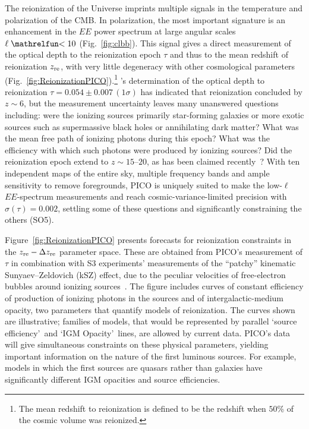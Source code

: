 \documentclass[PICOReport.tex]{subfiles}
\begin{document}
The reionization of the Universe imprints multiple signals in the temperature and polarization of the CMB.  In polarization, the most important signature is an enhancement in the $EE$ power spectrum at large angular scales $\ell \simlt 10$ (Fig.~\ref{fig:clbb}). This signal gives a direct measurement of the optical depth to the reionization epoch $\tau$ and thus to the mean redshift of reionization $z_{\rm re}$, with very little degeneracy with other cosmological parameters (Fig.~\ref{fig:ReionizationPICO}).\footnote{The mean redshift to reionization is defined to be the redshift when $50$\% of the cosmic volume was reionized.} \planck 's determination of the optical depth to reionization $\tau = 0.054 \pm 0.007\, (1\sigma) $ has indicated that reionization concluded by $z \sim 6$, but the measurement uncertainty leaves many unanswered questions including: were the ionizing sources primarily star-forming galaxies or more exotic sources such as supermassive black holes or annihilating dark matter? What was the mean free path of ionizing photons during this epoch?  What was the efficiency with which such photons were produced by ionizing sources?  
Did the reionization epoch extend to $z \sim 15$--$20$, as has been claimed recently~\citep{Miranda2017}?
With ten independent maps of the entire sky, multiple frequency bands and ample sensitivity to remove foregrounds, PICO is uniquely suited to make the low-$\ell$ $EE$-spectrum measurements and reach cosmic-variance-limited precision with $\sigma(\tau)=0.002$, settling some of these questions and significantly constraining the others (SO5).


Figure~\ref{fig:ReionizationPICO} presents forecasts for reionization constraints in the $z_{\rm re} - \Delta z_{\rm re}$ parameter space. These are obtained from PICO's measurement of $\tau$ in combination with S3 experiments' measurements of the ``patchy'' kinematic Sunyaev--Zeldovich (kSZ) effect, due to the peculiar velocities of free-electron bubbles around ionizing sources~\citep{Calabrese2014}.
The figure includes curves of constant efficiency of production of ionizing photons in the sources and of intergalactic-medium opacity, two parameters that quantify models of reionization. The curves shown are illustrative; families of models, that would be represented by parallel \lq source efficiency\rq~and \lq IGM Opacity\rq~lines, are allowed by current data. PICO's data will give simultaneous constraints on these physical parameters, yielding important information on the nature of the first luminous sources. For example, models in which the first sources are quasars rather than galaxies have significantly different IGM opacities and source efficiencies.
\end{document}

